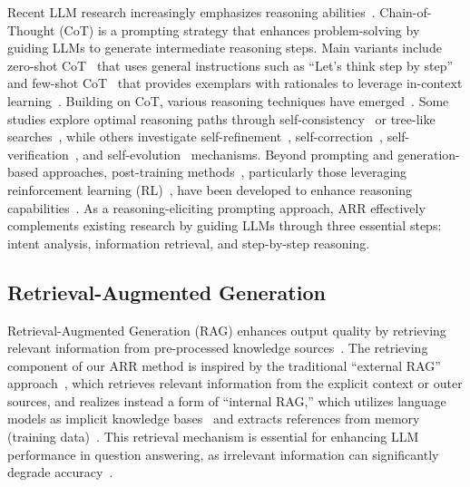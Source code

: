 Recent LLM research increasingly emphasizes reasoning abilities~\cite{qiao2023reasoning_survey,sun2023reasoning_survey}.
Chain-of-Thought (CoT) is a prompting strategy that enhances problem-solving by guiding LLMs to generate intermediate reasoning steps.
Main variants include zero-shot CoT~\cite{kojima2022cot_think_step_by_step} that uses general instructions such as ``Let's think step by step'' and few-shot CoT~\cite{wei2022cot} that provides exemplars with rationales to leverage in-context learning~\cite{openai2020gpt3,dong2024icl_survey}.
Building on CoT, various reasoning techniques have emerged~\cite{zhou2023least_to_most,zhou2023large,wang2023plan,yasunaga2024analogical,wang2024cot_no_prompting}.
Some studies explore optimal reasoning paths through self-consistency~\cite{wang2023self_consistency,chen2023uni_self_consistency} or tree-like searches~\cite{yao2023tot},
while others investigate self-refinement~\cite{aman2023self_refine}, self-correction~\cite{huang2024self_correct_no,tyen2024llms_correct,chen2024teaching}, self-verification~\cite{cobbe2021gsm8k,li2023making,lightman2024verify}, and self-evolution~\cite{guan2025rstar,lee2025evolving} mechanisms.
Beyond prompting and generation-based approaches, post-training methods~\cite{chu2025post_training}, particularly those leveraging reinforcement learning (RL)~\cite{sutton2018rl}, have been developed to enhance reasoning capabilities~\cite{shao2024deepseek_math,wang2024offline_rl,setlur2024rewarding,xu2025lrm}.
As a reasoning-eliciting prompting approach, ARR effectively complements existing research by guiding LLMs through three essential steps: intent analysis, information retrieval, and step-by-step reasoning.


\subsection{Retrieval-Augmented Generation}

Retrieval-Augmented Generation (RAG) enhances output quality by retrieving relevant information from pre-processed knowledge sources~\cite{gao2023rag4llm_survey}.
The retrieving component of our ARR method is inspired by the traditional ``external RAG'' approach~\cite{lewis2020rag4nlp}, which retrieves relevant information from the explicit context or outer sources, and realizes instead a form of ``internal RAG,'' which utilizes language models as implicit knowledge bases~\cite{petroni2019lm_as_kb,jiang2020lm_know} and extracts references from memory (training data)~\cite{carlini2021extracting,shi2024detecting}.
This retrieval mechanism is essential for enhancing LLM performance in question answering, as irrelevant information can significantly degrade accuracy~\cite{jones2022capturing,shi23distract,yoran2024making}.



%